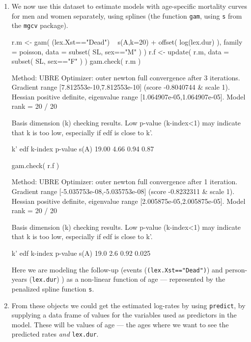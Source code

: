 \begin{enumerate}[resume]
  

\item We now use this dataset to estimate models with age-specific
  mortality curves for men and women separately, using splines (the
  function \texttt{gam}, using \texttt{s} from the \texttt{mgcv}
  package).
\begin{Schunk}
\begin{Sinput}
 r.m <- gam( (lex.Xst=="Dead") ~ s(A,k=20) + offset( log(lex.dur) ),
             family = poisson,
               data = subset( SL, sex=="M" ) )
 r.f <- update( r.m, data = subset( SL, sex=="F" ) )
 gam.check( r.m )
\end{Sinput}
\begin{Soutput}
Method: UBRE   Optimizer: outer newton
full convergence after 3 iterations.
Gradient range [7.812553e-10,7.812553e-10]
(score -0.8040744 & scale 1).
Hessian positive definite, eigenvalue range [1.064907e-05,1.064907e-05].
Model rank =  20 / 20 

Basis dimension (k) checking results. Low p-value (k-index<1) may
indicate that k is too low, especially if edf is close to k'.

        k'   edf k-index p-value
s(A) 19.00  4.66    0.94    0.87
\end{Soutput}
\begin{Sinput}
 gam.check( r.f )
\end{Sinput}
\begin{Soutput}
Method: UBRE   Optimizer: outer newton
full convergence after 1 iteration.
Gradient range [-5.035753e-08,-5.035753e-08]
(score -0.8232311 & scale 1).
Hessian positive definite, eigenvalue range [2.005875e-05,2.005875e-05].
Model rank =  20 / 20 

Basis dimension (k) checking results. Low p-value (k-index<1) may
indicate that k is too low, especially if edf is close to k'.

       k'  edf k-index p-value
s(A) 19.0  2.6    0.92   0.025
\end{Soutput}
\end{Schunk}
Here we are modeling the follow-up (events
(\texttt{(lex.Xst=="Dead")}) and person-years (\texttt{lex.dur}) ) as
a non-linear function of age --- represented by the penalized spline
function \texttt{s}.



\item From these objects we could get the estimated log-rates by using
  \texttt{predict}, by supplying a data frame of values for the
  variables used as predictors in the model. These will be values of
  age --- the ages where we want to see the predicted rates \emph{and}
  \texttt{lex.dur}.
  

\end{enumerate}
